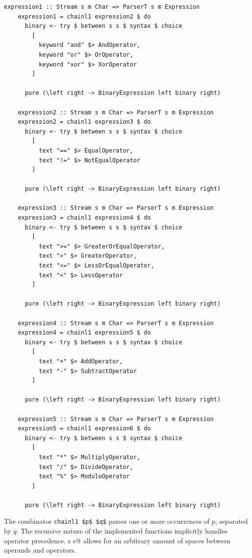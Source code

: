 \documentclass[UdineBachThesis,american,11pt]{PhdThesis}
\begin{document}
  \begin{lstlisting}[gobble=4,basicstyle=\ttfamily\small]
    expression1 :: Stream s m Char => ParserT s m Expression
    expression1 = chainl1 expression2 $ do
      binary <- try $ between s s $ syntax $ choice
        [
          keyword "and" $> AndOperator,
          keyword "or" $> OrOperator,
          keyword "xor" $> XorOperator
        ]

      pure (\left right -> BinaryExpression left binary right)

    expression2 :: Stream s m Char => ParserT s m Expression
    expression2 = chainl1 expression3 $ do
      binary <- try $ between s s $ syntax $ choice
        [
          text "==" $> EqualOperator,
          text "!=" $> NotEqualOperator
        ]

      pure (\left right -> BinaryExpression left binary right)

    expression3 :: Stream s m Char => ParserT s m Expression
    expression3 = chainl1 expression4 $ do
      binary <- try $ between s s $ syntax $ choice
        [
          text ">=" $> GreaterOrEqualOperator,
          text ">" $> GreaterOperator,
          text "<=" $> LessOrEqualOperator,
          text "<" $> LessOperator
        ]

      pure (\left right -> BinaryExpression left binary right)

    expression4 :: Stream s m Char => ParserT s m Expression
    expression4 = chainl1 expression5 $ do
      binary <- try $ between s s $ syntax $ choice
        [
          text "+" $> AddOperator,
          text "-" $> SubtractOperator
        ]

      pure (\left right -> BinaryExpression left binary right)

    expression5 :: Stream s m Char => ParserT s m Expression
    expression5 = chainl1 expression6 $ do
      binary <- try $ between s s $ syntax $ choice
        [
          text "*" $> MultiplyOperator,
          text "/" $> DivideOperator,
          text "%" $> ModuloOperator
        ]

      pure (\left right -> BinaryExpression left binary right)
  \end{lstlisting}

  The combinator \lstinline[mathescape]@chainl1 $p$ $q$@ parses one or more
  occurrences of $p$, separated by $q$. The recursive nature of the implemented
  functions implicitly handles operator precedence. \lstinline@between s s@
  allows for an arbitrary amount of spaces between operands and operators.
\end{document}
